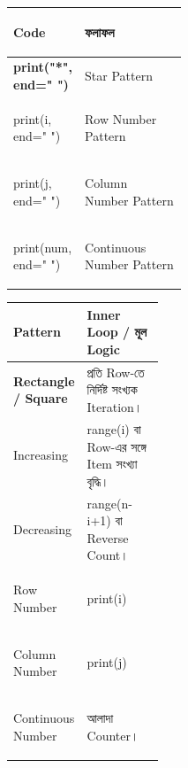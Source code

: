 \begin{tabularx}
{\linewidth}
{
|>{\bfseries\RaggedRight\arraybackslash}p{0.39\linewidth}
|Y|
}

\hline
{}

\textbf{Code}
&
\textbf{ফলাফল}
\\
\hline

\textenglish{\ttfamily print("*", end=" ")}
&
Star Pattern
\\
\hline

\textenglish{\ttfamily print(i, end=" ")}
&
Row Number Pattern
\\
\hline

\textenglish{\ttfamily print(j, end=" ")}
&
Column Number Pattern
\\
\hline

\textenglish{\ttfamily print(num, end=" ")}
&
Continuous Number Pattern
\\
\hline

\end{tabularx}



\begin{tabularx}
{\linewidth}
{
|>{\bfseries\RaggedRight\arraybackslash}p{0.34\linewidth}
|Y|
}

\hline
{}

\textbf{Pattern}
&
\textbf{Inner Loop / মূল Logic}
\\
\hline

Rectangle / Square
&
প্রতি Row-তে নির্দিষ্ট সংখ্যক Iteration।
\\
\hline

Increasing
&
\textenglish{\ttfamily range(i)}
বা Row-এর সঙ্গে Item সংখ্যা বৃদ্ধি।
\\
\hline

Decreasing
&
\textenglish{\ttfamily range(n-i+1)}
বা Reverse Count।
\\
\hline

Row Number
&
\textenglish{\ttfamily print(i)}
\\
\hline

Column Number
&
\textenglish{\ttfamily print(j)}
\\
\hline

Continuous Number
&
আলাদা Counter।
\\
\hline

\end{tabularx}

